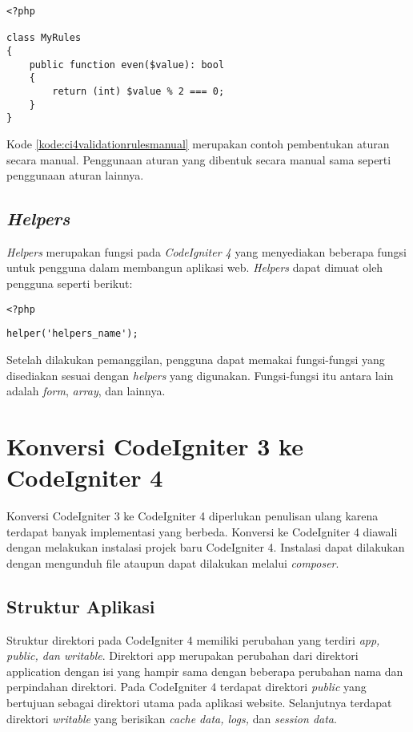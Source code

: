 \begin{lstlisting}[caption=Contoh kode pembentukan aturan secara manual pada file \texttt{Validation.php}. ,label=kode:ci4validationrulesmanual]
<?php

class MyRules
{
    public function even($value): bool
    {
        return (int) $value % 2 === 0;
    }
}
\end{lstlisting}

Kode \ref{kode:ci4validationrulesmanual} merupakan contoh pembentukan aturan secara manual. Penggunaan aturan yang dibentuk secara manual sama seperti penggunaan aturan lainnya.

\subsection{\textit{Helpers}}
\textit{Helpers} merupakan fungsi pada \textit{CodeIgniter 4} yang menyediakan beberapa fungsi untuk pengguna dalam membangun aplikasi web. \textit{Helpers} dapat dimuat oleh pengguna seperti berikut:

\begin{center}
\verb|<?php|

\verb|helper('helpers_name');|
\end{center}
Setelah dilakukan pemanggilan, pengguna dapat memakai fungsi-fungsi yang disediakan sesuai dengan \textit{helpers} yang digunakan. Fungsi-fungsi itu antara lain adalah \textit{form}, \textit{array}, dan lainnya.

\section{Konversi CodeIgniter 3 ke CodeIgniter 4\cite{codeigniter:23:ci4}}
\label{sec:konversici3c4}
 
Konversi CodeIgniter 3 ke CodeIgniter 4 diperlukan penulisan ulang karena terdapat banyak implementasi yang berbeda. Konversi ke CodeIgniter 4 diawali dengan melakukan instalasi projek baru CodeIgniter 4. Instalasi dapat dilakukan dengan mengunduh file ataupun dapat dilakukan melalui \textit{composer}.


\subsection{Struktur Aplikasi}

Struktur direktori pada CodeIgniter 4 memiliki perubahan yang terdiri \textit{app, public, dan writable}. Direktori app merupakan perubahan dari direktori application dengan isi yang hampir sama dengan beberapa perubahan nama dan perpindahan direktori. Pada CodeIgniter 4 terdapat direktori \textit{public} yang bertujuan sebagai direktori utama pada aplikasi website. Selanjutnya terdapat direktori \textit{writable} yang berisikan \textit{cache data, logs,} dan \textit{session data}.

